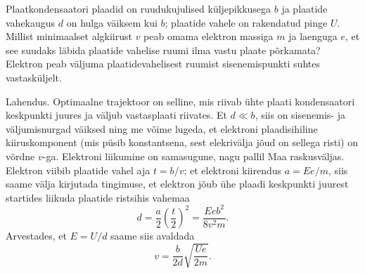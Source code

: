
Plaatkondensaatori plaadid on ruudukujulised küljepikkusega $b$ ja plaatide vahekaugus $d$ on hulga väiksem kui $b$; plaatide vahele on rakendatud pinge $U$. Millist minimaalset algkiirust $v$ peab omama elektron massiga $m$ ja laenguga $e$, et see suudaks läbida plaatide vahelise ruumi ilma vastu plaate põrkamata? Elektron peab väljuma plaatidevahelisest ruumist sisenemispunkti suhtes vastasküljelt.




\hint

\solu
Lahendus. Optimaalne trajektoor on selline, mis riivab ühte plaati kondensaatori keskpunkti juures ja väljub vastasplaati riivates. Et $d\ll b$, siis on sisenemis- ja väljumisnurgad väiksed ning me võime lugeda, et elektroni plaadisihiline kiiruskomponent (mis püsib konstantsena, sest elekrivälja jõud on sellega risti) on võrdne $v$-ga. Elektroni liikumine on samasugune, nagu pallil Maa raskusväljas. Elektron viibib plaatide vahel aja $t=b/v$; et elektroni kiirendus $a=Ee/m$, siis saame välja kirjutada tingimuse, et elektron jõub ühe plaadi keskpunkti juurest startides liikuda plaatide ristsihis vahemaa $$d=\frac a2\left(\frac t2\right)^2=\frac{Eeb^2}{8v^2m}.$$ Arvestades, et $E=U/d$ saame siis avaldada $$v=\frac b{2d}\sqrt{\frac{Ue}{2m}}.$$
\probend